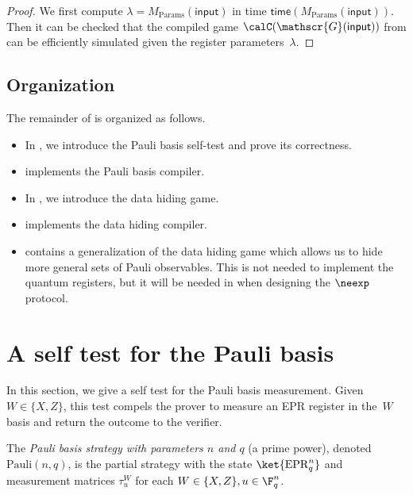 \documentclass[11pt]{article}
\newcommand{\game}{\mathscr{G}}
\newcommand{\paulistrat}[2]{\mathrm{Pauli}(#1,#2)}
\begin{document}
\begin{proof}
We first compute $\lambda = M_{\mathrm{Params}}(\mathsf{input})$
in time $\mathsf{time}(M_{\mathrm{Params}}(\mathsf{input}))$.
Then it can be checked that the compiled game $\calC(\game(\mathsf{input}))$ from 
can be efficiently simulated given the register parameters~$\lambda$.
\end{proof}

\subsection{Organization}

The remainder of  is organized as follows.
\begin{itemize}
\item In , we introduce the Pauli basis self-test and prove its correctness.
\item {} implements the Pauli basis compiler.
\item In , we introduce the data hiding game.
\item {} implements the data hiding compiler.
\item {} contains a generalization of the data hiding game which allows us to hide more general sets of Pauli observables.
		This is not needed to implement the quantum registers, but it will be needed in  when designing the $\neexp$ protocol.
\end{itemize}



\section{A self test for the Pauli basis}\label{sec:self-test-pauli}

In this section, we give a self test for the Pauli basis measurement.
Given~$W \in \{X, Z\}$, this test compels the prover
to measure an EPR register in the~$W$ basis
and return the outcome to the verifier.

\begin{definition}
The \emph{Pauli basis strategy with parameters $n$ and $q$} (a prime power),
denoted $\paulistrat{n}{q}$, is the partial strategy
with the state $\ket{\mathrm{EPR}_q^n}$ and measurement matrices $\tau^W_u$ for each $W \in \{X,Z\}, u \in \F_q^n$.
\end{definition}
\end{document}
